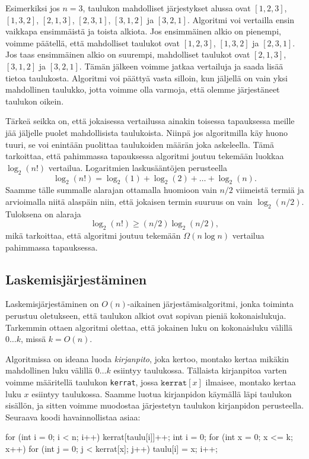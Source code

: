 Esimerkiksi jos $n=3$, taulukon mahdolliset järjestykset alussa ovat
$[1,2,3]$, $[1,3,2]$, $[2,1,3]$, $[2,3,1]$, $[3,1,2]$ ja $[3,2,1]$.
Algoritmi voi vertailla ensin vaikkapa ensimmäistä ja toista alkiota.
Jos ensimmäinen alkio on pienempi, voimme päätellä,
että mahdolliset taulukot ovat $[1,2,3]$, $[1,3,2]$ ja $[2,3,1]$.
Jos taas ensimmäinen alkio on suurempi,
mahdolliset taulukot ovat $[2,1,3]$, $[3,1,2]$ ja $[3,2,1]$.
Tämän jälkeen voimme jatkaa vertailuja ja saada lisää tietoa taulukosta.
Algoritmi voi päättyä vasta silloin, kun jäljellä on vain yksi
mahdollinen taulukko, jotta voimme olla varmoja, että olemme
järjestäneet taulukon oikein.

Tärkeä seikka on, että jokaisessa vertailussa ainakin toisessa
tapauksessa meille jää jäljelle puolet mahdollisista taulukoista.
Niinpä jos algoritmilla käy huono tuuri, se voi enintään puolittaa
taulukoiden määrän joka askeleella.
Tämä tarkoittaa, että pahimmassa tapauksessa algoritmi joutuu
tekemään luokkaa $\log_2(n!)$ vertailua.
Logaritmien laskusääntöjen perusteella
\[
\log_2(n!) = \log_2(1)+\log_2(2)+\dots+\log_2(n).
\]
Saamme tälle summalle alarajan ottamalla huomioon vain
$n/2$ viimeistä termiä ja arvioimalla niitä alaspäin niin, 
että jokaisen termin suuruus on vain $\log_2(n/2)$. Tuloksena on alaraja
\[
\log_2(n!) \ge (n/2) \log_2(n/2),
\]
mikä tarkoittaa, että algoritmi joutuu
tekemään $\Omega(n \log n)$ vertailua pahimmassa tapauksessa.

\subsection{Laskemisjärjestäminen}

Laskemisjärjestäminen on $O(n)$-aikainen järjestämisalgoritmi,
jonka toiminta perustuu oletukseen, että taulukon alkiot
ovat sopivan pieniä kokonaislukuja.
Tarkemmin ottaen algoritmi olettaa, että jokainen luku on
kokonaisluku välillä $0 \dots k$, missä $k=O(n)$.

Algoritmissa on ideana luoda \emph{kirjanpito}, joka kertoo,
montako kertaa mikäkin mahdollinen luku välillä $0 \dots k$
esiintyy taulukossa.
Tällaista kirjanpitoa varten voimme määritellä taulukon
\texttt{kerrat}, jossa $\texttt{kerrat}[x]$ ilmaisee,
montako kertaa luku $x$ esiintyy taulukossa.
Saamme luotua kirjanpidon käymällä läpi taulukon sisällön,
ja sitten voimme muodostaa järjestetyn taulukon
kirjanpidon perusteella.
Seuraava koodi havainnollistaa asiaa:

\begin{code}
for (int i = 0; i < n; i++) {
    kerrat[taulu[i]]++;
}
int i = 0;
for (int x = 0; x <= k; x++) {
    for (int j = 0; j < kerrat[x]; j++) {
        taulu[i] = x;
        i++;
    }
}
\end{code}

